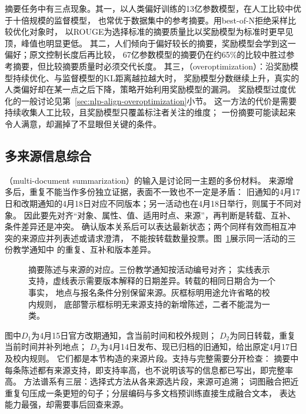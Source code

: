 摘要任务中有三点现象。其一，以人类偏好训练的13亿参数模型，在人工比较中优于十倍规模的监督模型，
也常优于数据集中的参考摘要。用best-of-N拒绝采样比较优化对象时，
以ROUGE为选择标准的摘要质量比以奖励模型为标准时更早见顶，峰值也明显更低。
其二，人们倾向于偏好较长的摘要，奖励模型会学到这一偏好；原文控制长度后再比较，
67亿参数模型的摘要仍在约65\%的比较中胜过参考摘要，但比较摘要质量时必须交代长度。
其三，（overoptimization）：沿奖励模型持续优化、与监督模型的KL距离越拉越大时，
奖励模型分数继续上升，真实的人类偏好却在某一点之后下降，策略开始利用奖励模型的漏洞。
奖励模型过度优化的一般讨论见第~\ref{sec:nlp-align-overoptimization}小节。
这一方法的代价是需要持续收集人工比较，且奖励模型只覆盖标注者关注的维度；
一份摘要可能读起来令人满意，却漏掉了不显眼但关键的条件。

\subsection{多来源信息综合}
\label{sec:nlp-generation-multi-summary}

（multi-document summarization）的输入是讨论同一主题的多份材料。
来源增多后，重复不能当作多份独立证据，表面不一致也不一定是矛盾：
旧通知的4月17日和改期通知的4月18日对应不同版本；另一活动也在4月18日举行，则属于不同对象。
因此要先对齐“对象、属性、值、适用时点、来源”，再判断是转载、互补、条件差异还是冲突。
确认版本关系后可以表达最新状态；两个同样有效而相互冲突的来源应并列表述或请求澄清，
不能按转载数量投票。图~\ref{fig:nlp-generation-provenance}展示同一活动的三份教学通知中
的重复、互补和版本差异。

\begin{figure}[htbp]
  \centering
  
  \caption{摘要陈述与来源的对应。三份教学通知按活动编号对齐；
  实线表示支持，虚线表示需要版本解释的日期差异。转载的相同日期合为一个事实，
  地点与报名条件分别保留来源。灰框标明用途允许省略的校内规则，
  底部警示框标明无来源支持的新增陈述，二者不能混为一类。}
  \label{fig:nlp-generation-provenance}
\end{figure}
\FloatBarrier

图中$D_1$为4月15日官方改期通知，含当前时间和校外规则；
$D_2$为同日转载，重复当前时间并补列地点；
$D_3$为4月14日发布、现已归档的旧通知，给出原定4月17日及校内规则。
它们都是本节构造的来源片段。支持与完整需要分开检查：
摘要中每条陈述都有来源支持，即支持率高，也不说明该写的信息都已写出，即完整率高。
方法谱系有三层：选择式方法从各来源选片段，来源可追溯；
词图融合把近重复句压成一条更短的句子；分层编码与多文档预训练直接生成融合文本，
表达能力最强，却需要事后回查来源。

